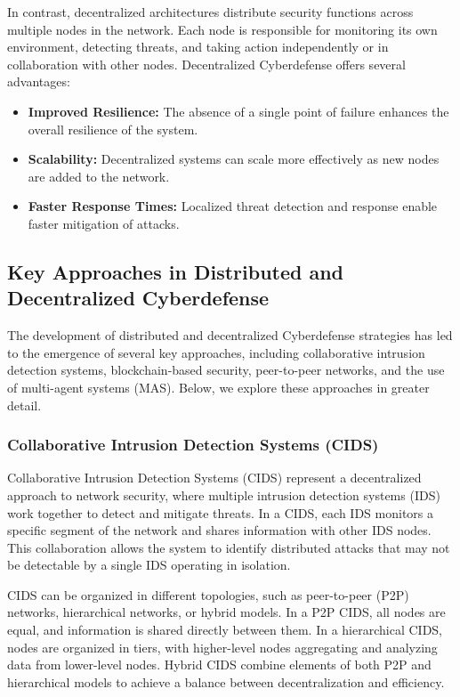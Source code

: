 In contrast, decentralized architectures distribute security functions across multiple nodes in the network. Each node is responsible for monitoring its own environment, detecting threats, and taking action independently or in collaboration with other nodes. Decentralized Cyberdefense offers several advantages:

\begin{itemize}
    \item \textbf{Improved Resilience:} The absence of a single point of failure enhances the overall resilience of the system.
    \item \textbf{Scalability:} Decentralized systems can scale more effectively as new nodes are added to the network.
    \item \textbf{Faster Response Times:} Localized threat detection and response enable faster mitigation of attacks.
\end{itemize}

\subsection{Key Approaches in Distributed and Decentralized Cyberdefense}

The development of distributed and decentralized Cyberdefense strategies has led to the emergence of several key approaches, including collaborative intrusion detection systems, blockchain-based security, peer-to-peer networks, and the use of multi-agent systems (MAS). Below, we explore these approaches in greater detail.

\subsubsection{Collaborative Intrusion Detection Systems (CIDS)}

Collaborative Intrusion Detection Systems (CIDS) represent a decentralized approach to network security, where multiple intrusion detection systems (IDS) work together to detect and mitigate threats. In a CIDS, each IDS monitors a specific segment of the network and shares information with other IDS nodes. This collaboration allows the system to identify distributed attacks that may not be detectable by a single IDS operating in isolation.

CIDS can be organized in different topologies, such as peer-to-peer (P2P) networks, hierarchical networks, or hybrid models. In a P2P CIDS, all nodes are equal, and information is shared directly between them. In a hierarchical CIDS, nodes are organized in tiers, with higher-level nodes aggregating and analyzing data from lower-level nodes. Hybrid CIDS combine elements of both P2P and hierarchical models to achieve a balance between decentralization and efficiency.

